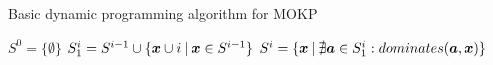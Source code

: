 \begin{algorithm}
    \caption{Basic dynamic programming algorithm for MOKP}
    \label{nemull}
    \begin{algorithmic}[1] %
        \State $S^0 = \big\{\emptyset\big\}$
          \State $S_1^i = S^{i-1} \cup \{\boldsymbol{x} \cup i \:|\: \boldsymbol{x} \in S^{i-1}\}$
          \State $S^i = \{\boldsymbol{x} \:|\: \nexists \boldsymbol{a} \in S_1^i: dominates(\boldsymbol{a}, \boldsymbol{x}) \}$
        \EndFor
      \EndFunction
    \end{algorithmic}
\end{algorithm}
